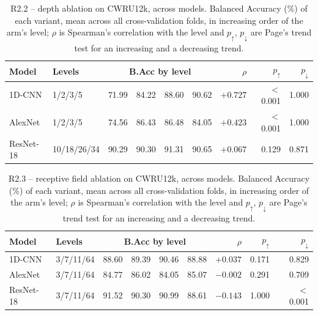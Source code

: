 \begin{table}[ht]
\centering
\caption{R2.2 -- depth ablation on CWRU12k, across models. Balanced Accuracy (\%) of each variant, mean across all cross-validation folds, in increasing order of the arm's level; $\rho$ is Spearman's correlation with the level and $p_\uparrow$, $p_\downarrow$ are Page's trend test for an increasing and a decreasing trend.}
\label{tab:ablation_summary_depth_cwru12k}
\begin{tabular}{@{}l l c c c c r r r@{}}
\toprule
\textbf{Model} & \textbf{Levels} & \multicolumn{4}{c}{\textbf{B.Acc by level}} & $\rho$ & $p_\uparrow$ & $p_\downarrow$ \\ \midrule
1D-CNN & 1/2/3/5 & 71.99 & 84.22 & 88.60 & 90.62 & $+0.727$ & $<$0.001 & 1.000 \\
AlexNet & 1/2/3/5 & 74.56 & 86.43 & 86.48 & 84.05 & $+0.423$ & $<$0.001 & 1.000 \\
ResNet-18 & 10/18/26/34 & 90.29 & 90.30 & 91.31 & 90.65 & $+0.067$ & 0.129 & 0.871 \\
\bottomrule
\end{tabular}
\end{table}

\begin{table}[ht]
\centering
\caption{R2.3 -- receptive field ablation on CWRU12k, across models. Balanced Accuracy (\%) of each variant, mean across all cross-validation folds, in increasing order of the arm's level; $\rho$ is Spearman's correlation with the level and $p_\uparrow$, $p_\downarrow$ are Page's trend test for an increasing and a decreasing trend.}
\label{tab:ablation_summary_kernel_cwru12k}
\begin{tabular}{@{}l l c c c c r r r@{}}
\toprule
\textbf{Model} & \textbf{Levels} & \multicolumn{4}{c}{\textbf{B.Acc by level}} & $\rho$ & $p_\uparrow$ & $p_\downarrow$ \\ \midrule
1D-CNN & 3/7/11/64 & 88.60 & 89.39 & 90.46 & 88.88 & $+0.037$ & 0.171 & 0.829 \\
AlexNet & 3/7/11/64 & 84.77 & 86.02 & 84.05 & 85.07 & $-0.002$ & 0.291 & 0.709 \\
ResNet-18 & 3/7/11/64 & 91.52 & 90.30 & 90.99 & 88.61 & $-0.143$ & 1.000 & $<$0.001 \\
\bottomrule
\end{tabular}
\end{table}

